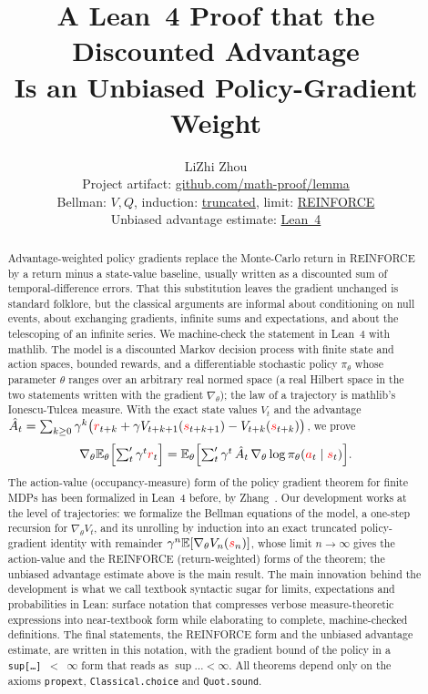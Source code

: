 \documentclass[11pt,a4paper]{article}
\title{A Lean~4 Proof that the Discounted Advantage\\Is an Unbiased Policy-Gradient Weight}
\author{LiZhi Zhou\\[0.3em]
\small Project artifact: \href{https://github.com/math-proof/lemma}{github.com/math-proof/lemma}\\[0.4em]
\small
Bellman:
\href{http://www.lemma.cn/lean/?module=Tensor.And.Eq.Expect.of.Eq_Conditioned.Eq_Expect.Eq_Expect.Bellman}{$V,Q$},
\quad
induction:
\href{http://www.lemma.cn/lean/?module=Tensor.Eq.Grad.Expect.of.Eq_Conditioned.Eq_Expect.Eq_Expect.policy_gradient}{truncated},
\quad
limit:
\href{http://www.lemma.cn/lean/?module=Tensor.Eq.Dot.Grad.Expect.of.Eq_Conditioned.IsFinite.policy_gradient_theorem}{REINFORCE}\\[0.25em]
Unbiased advantage estimate:
\href{http://www.lemma.cn/lean/?module=Tensor.EqDot_GradExpect.of.Eq_Conditioned.Eq_Expect.IsFinite.IsFinite.unbiased_advantage_estimate}{Lean~4}}
\date{}
\newcommand{\E}{\mathbb{E}}
\newcommand{\rv}[1]{{\color{red}#1}}       %
\newcommand{\sv}{\rv{s}}
\newcommand{\av}{\rv{a}}
\newcommand{\rw}{\rv{r}}
\newcommand{\grad}{\nabla_{\theta}}
\newcommand{\tsum}{\textstyle\sum'}
\begin{document}
\maketitle

\begin{abstract}
Advantage-weighted policy gradients replace the Monte-Carlo return in REINFORCE by a return minus a state-value baseline, usually written as a discounted sum of temporal-difference errors.
That this substitution leaves the gradient unchanged is standard folklore, but the classical arguments are informal about conditioning on null events, about exchanging gradients, infinite sums and expectations, and about the telescoping of an infinite series.
We machine-check the statement in Lean~4 with mathlib.
The model is a discounted Markov decision process with finite state and action spaces, bounded rewards, and a differentiable stochastic policy $\pi_\theta$ whose parameter $\theta$ ranges over an arbitrary real normed space (a real Hilbert space in the two statements written with the gradient $\nabla_\theta$); the law of a trajectory is mathlib's Ionescu-Tulcea measure.
With the exact state values $V_t$ and the advantage
$\hat A_t=\sum_{k\ge0}\gamma^k\bigl(\rw_{t+k}+\gamma V_{t+k+1}(\sv_{t+k+1})-V_{t+k}(\sv_{t+k})\bigr)$,
we prove
\[
\grad\E_\theta\Bigl[\tsum_{t}\gamma^t\rw_t\Bigr]
=\E_\theta\Bigl[\tsum_{t}\gamma^t\,\hat A_t\,\grad\log\pi_\theta(\av_t\mid\sv_t)\Bigr].
\]
The action-value (occupancy-measure) form of the policy gradient theorem for finite MDPs has been formalized in Lean~4 before, by Zhang~\cite{zhang2026pg}.
Our development works at the level of trajectories: we formalize the Bellman equations of the model, a one-step recursion for $\grad V_t$, and its unrolling by induction into an exact truncated policy-gradient identity with remainder $\gamma^n\E[\grad V_n(\sv_n)]$, whose limit $n\to\infty$ gives the action-value and the REINFORCE (return-weighted) forms of the theorem; the unbiased advantage estimate above is the main result.
The main innovation behind the development is what we call textbook syntactic sugar for limits, expectations and probabilities in Lean: surface notation that compresses verbose measure-theoretic expressions into near-textbook form while elaborating to complete, machine-checked definitions. The final statements, the REINFORCE form and the unbiased advantage estimate, are written in this notation, with the gradient bound of the policy in a \texttt{sup[\dots] $<$ $\infty$} form that reads as $\sup\dots<\infty$.
All theorems depend only on the axioms \texttt{propext}, \texttt{Classical.choice} and \texttt{Quot.sound}.
\end{abstract}
\end{document}

